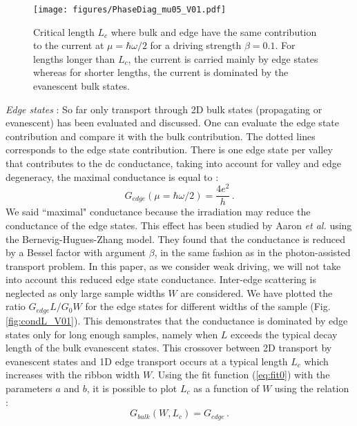 \documentclass[aps,prb,showpacs,superscriptaddress,twocolumn,10pt,floatfix]{revtex4-1}
\begin{document}
\medskip

\begin{figure}[h!]
	\texttt{[image: figures/PhaseDiag\_mu05\_V01.pdf]}
	\caption{Critical length $L_c$ where bulk and edge have the same contribution to the current at $\mu=\hbar\omega/2$ for a driving strength $\beta=0.1$. For lengths longer than $L_c$, the current is carried mainly by edge states whereas for shorter lengths, the current is dominated by the evanescent bulk states.}
	\label{fig:phase_diagV01}
\end{figure}

\textit{Edge states} : So far only transport through 2D bulk states (propagating or evanescent) has been evaluated and discussed. One can evaluate the edge state contribution and compare it with the bulk contribution. The dotted lines corresponds to the edge state contribution. There is one edge state per valley that contributes to the dc conductance\cite{Usaj2014,Foa2014,Perez-Piskunow2015}, taking into account for valley and edge degeneracy, the maximal conductance is equal to :
\begin{equation}
G_{edge}(\mu=\hbar\omega/2)=\frac{4e^2}{h} \, .
\end{equation}
We said ``maximal" conductance because the irradiation may reduce the conductance of the edge states. This effect has been studied by Aaron \textit{et al.}\cite{Aaron2015} using the Bernevig-Hugues-Zhang model\cite{Bernevig2006}. They found that the conductance is reduced by a Bessel factor with argument $\beta$, in the same fashion as in the photon-assisted transport problem. In this paper, as we consider weak driving, we will not take into account this reduced edge state conductance. Inter-edge scattering is neglected as only large sample widths $W$ are considered. We have plotted the ratio $G_{edge}L/G_0W$ for the edge states for different widths of the sample (Fig. \ref{fig:condL_V01}). This demonstrates that the conductance is dominated by edge states only for long enough samples, namely when $L$ exceeds the typical decay length of the bulk evanescent states. This crossover between 2D transport by evanescent states and 1D edge transport occurs at a typical length $L_c$ which increases with the ribbon width $W$. Using the fit function (\ref{eq:fit0}) with the parameters $a$ and $b$, it is possible to plot $L_c$ as a function of $W$ using the relation :
\begin{equation}
	G_{bulk}(W,L_c)=G_{edge}\, .
\end{equation}
\end{document}
